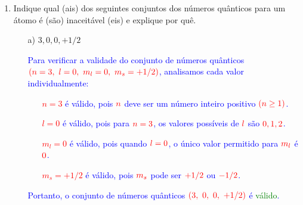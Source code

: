 \documentclass[a4paper, 12pt]{article}
\begin{document}
\begin{enumerate}
	      
	\item Indique qual (ais) dos seguintes conjuntos dos números quânticos para um átomo é (são) inaceitável (eis) e explique por quê.
	      \begin{enumerate}
		      \item[a)] \(3, 0, 0, +1/2\)
		            \\[10pt]
		            \textcolor{blue}{
			            Para verificar a validade do conjunto de números quânticos \(\textcolor{red}{(n = 3,\ l = 0,\ m_l = 0,\ m_s = +1/2)}\), analisamos cada valor individualmente:
			            \begin{itemize}
				            \item[] \textcolor{red}{\(n = 3\)} é válido, pois \(\textcolor{red}{n}\) deve ser um número inteiro positivo \(\textcolor{red}{(n \geq 1)}\).
				            \item[] \textcolor{red}{\(l = 0\)} é válido, pois para \(\textcolor{red}{n = 3}\), os valores possíveis de \(\textcolor{red}{l}\) são \(\textcolor{red}{0, 1, 2}\).
				            \item[] \textcolor{red}{\(m_l = 0\)} é válido, pois quando \(\textcolor{red}{l = 0}\), o único valor permitido para \(\textcolor{red}{m_l}\) é \(\textcolor{red}{0}\).
				            \item[] \textcolor{red}{\(m_s = +1/2\)} é válido, pois \(\textcolor{red}{m_s}\) pode ser \(\textcolor{red}{+1/2}\) ou \(\textcolor{red}{-1/2}\).
			            \end{itemize}
			            \textcolor{blue}{Portanto, o conjunto de números quânticos \(\textcolor{red}{(3,\ 0,\ 0,\ +1/2)}\) é \textcolor{green}{válido}.}
		            }
		            

\end{enumerate}
\end{enumerate}
\end{document}
